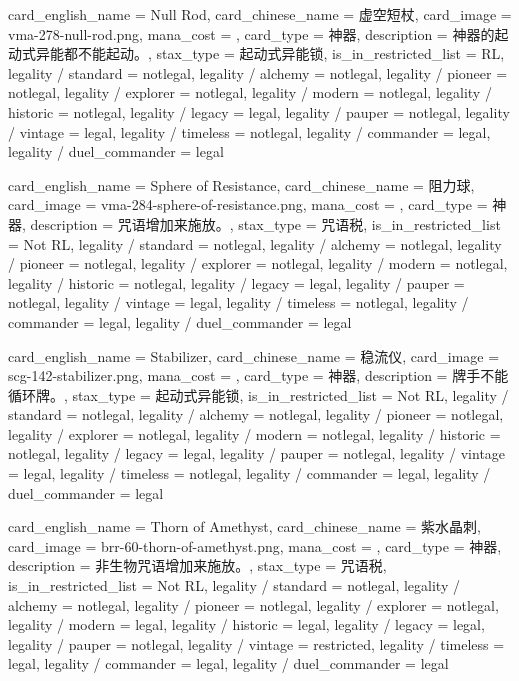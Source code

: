 \documentclass[lang = cn, color = black, 10pt]{AllThatStax}
\begin{document}
\card
{
	card_english_name = {Null Rod},
	card_chinese_name = {虚空短杖},
	card_image = vma-278-null-rod.png,
	mana_cost = ,
	card_type = 神器,
	description = {神器的起动式异能都不能起动。},
	stax_type = 起动式异能锁,
	is_in_restricted_list = RL,
	legality / standard = notlegal,
	legality / alchemy = notlegal,
	legality / pioneer = notlegal,
	legality / explorer = notlegal,
	legality / modern = notlegal,
	legality / historic = notlegal,
	legality / legacy = legal,
	legality / pauper = notlegal,
	legality / vintage = legal,
	legality / timeless = notlegal,
	legality / commander = legal,
	legality / duel_commander = legal
}

\card
{
	card_english_name = {Sphere of Resistance},
	card_chinese_name = {阻力球},
	card_image = vma-284-sphere-of-resistance.png,
	mana_cost = ,
	card_type = 神器,
	description = {咒语增加来施放。},
	stax_type = 咒语税,
	is_in_restricted_list = Not RL,
	legality / standard = notlegal,
	legality / alchemy = notlegal,
	legality / pioneer = notlegal,
	legality / explorer = notlegal,
	legality / modern = notlegal,
	legality / historic = notlegal,
	legality / legacy = legal,
	legality / pauper = notlegal,
	legality / vintage = legal,
	legality / timeless = notlegal,
	legality / commander = legal,
	legality / duel_commander = legal
}

\card
{
	card_english_name = {Stabilizer},
	card_chinese_name = {稳流仪},
	card_image = scg-142-stabilizer.png,
	mana_cost = ,
	card_type = 神器,
	description = {牌手不能循环牌。},
	stax_type = 起动式异能锁,
	is_in_restricted_list = Not RL,
	legality / standard = notlegal,
	legality / alchemy = notlegal,
	legality / pioneer = notlegal,
	legality / explorer = notlegal,
	legality / modern = notlegal,
	legality / historic = notlegal,
	legality / legacy = legal,
	legality / pauper = notlegal,
	legality / vintage = legal,
	legality / timeless = notlegal,
	legality / commander = legal,
	legality / duel_commander = legal
}

\card
{
	card_english_name = {Thorn of Amethyst},
	card_chinese_name = {紫水晶刺},
	card_image = brr-60-thorn-of-amethyst.png,
	mana_cost = ,
	card_type = 神器,
	description = {非生物咒语增加来施放。},
	stax_type = 咒语税,
	is_in_restricted_list = Not RL,
	legality / standard = notlegal,
	legality / alchemy = notlegal,
	legality / pioneer = notlegal,
	legality / explorer = notlegal,
	legality / modern = legal,
	legality / historic = legal,
	legality / legacy = legal,
	legality / pauper = notlegal,
	legality / vintage = restricted,
	legality / timeless = legal,
	legality / commander = legal,
	legality / duel_commander = legal
}
\end{document}
